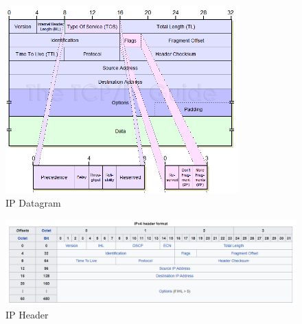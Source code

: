 \documentclass[a4paper]{report}
\begin{document}
\begin{figure}[H]
\centering
\includegraphics[width=0.8\textwidth]{ipformat.png}
\caption{IP Datagram}
\end{figure}
\begin{figure}[H]
\centering
\includegraphics[width=\textwidth]{ip_header.png}
\caption{IP Header}
\end{figure}
\end{document}
